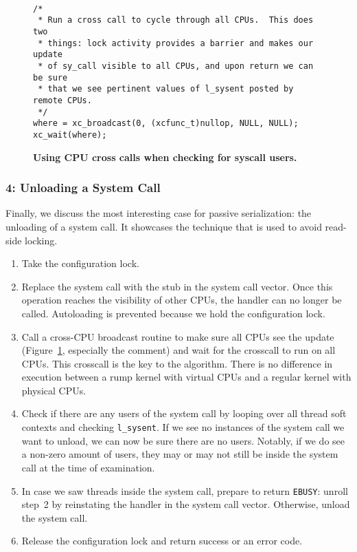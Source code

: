 \begin{figure}[t]
{\tt \scriptsize 
\begin{verbatim}
/*
 * Run a cross call to cycle through all CPUs.  This does two
 * things: lock activity provides a barrier and makes our update
 * of sy_call visible to all CPUs, and upon return we can be sure
 * that we see pertinent values of l_sysent posted by remote CPUs.
 */
where = xc_broadcast(0, (xcfunc_t)nullop, NULL, NULL);
xc_wait(where);
\end{verbatim}}
\caption[Using CPU cross calls when checking for syscall users]{
\textbf{Using CPU cross calls when checking for syscall users.}}
\label{fig:sysxcall}
\end{figure}

\subsubsection*{4: Unloading a System Call}

Finally, we discuss the most interesting case for passive serialization:
the unloading of a system call.  It showcases the technique that
is used to avoid read-side locking.

\begin{enumerate}
\item	Take the configuration lock.
\item	Replace the system call with the stub in the system call vector.
	Once this operation reaches the visibility of other CPUs, the
	handler can no longer be called.  Autoloading is prevented because
	we hold the configuration lock.
\item   Call a cross-CPU broadcast routine to make sure all CPUs
	see the update (Figure~\ref{fig:sysxcall}, especially the
	comment) and wait for the crosscall to run on all CPUs.
	This crosscall is the key to the algorithm.  There is no difference
	in execution between a rump kernel with virtual CPUs and
	a regular kernel with physical CPUs.
\item   Check if there are any users of the system call by
	looping over all thread soft contexts and checking
	\verb+l_sysent+.  If we see no instances of the system call
	we want to unload, we can now be sure there are no users.
	Notably, if we do see a non-zero amount of users, they may
	or may not still be inside the system call at the time of
	examination.
\item   In case we saw threads inside the system call, prepare to
	return \texttt{EBUSY}: unroll step~2 by reinstating the
	handler in the system call vector.  Otherwise, unload the
	system call.
\item   Release the configuration lock and return success or an
	error code.
\end{enumerate}

